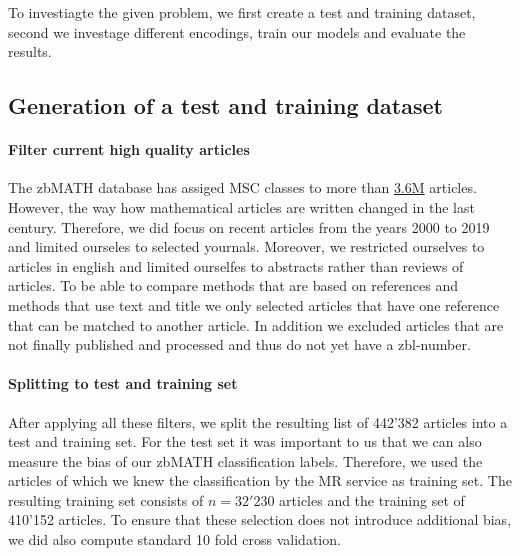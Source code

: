To investiagte the given problem, we first create a test and training dataset, second we investage different encodings, train our models and evaluate the results.
\subsection{Generation of a test and training dataset}
\paragraph{Filter current high quality articles}
The zbMATH database has assiged MSC classes to more than
\href{https://zbmath.org/?q=cc%3A*}%
{3.6M} articles.
However, the way how mathematical articles are written changed in the last century.
Therefore, we did focus on recent articles from the years 2000 to 2019 and limited ourseles to selected yournals.
Moreover, we restricted ourselves to articles in english and limited ourselfes to abstracts rather than reviews of articles.
To be able to compare methods that are based on references and methods that use text and title we only selected articles that have one reference that
can be matched to another article.
In addition we excluded articles that are not finally published and processed and thus do not yet have a zbl-number.
\paragraph{Splitting to test and training set}
After applying all these filters, we split the resulting list of 442'382 articles into a test and training set.
For the test set it was important to us that we can also measure the bias of our zbMATH classification labels.
Therefore, we used the articles of which we knew the classification by the MR service as training set.
The resulting training set consists of $n=32'230$ articles and the training set of 410'152 articles.
To ensure that these selection does not introduce additional bias, we did also compute standard 10 fold cross validation.
